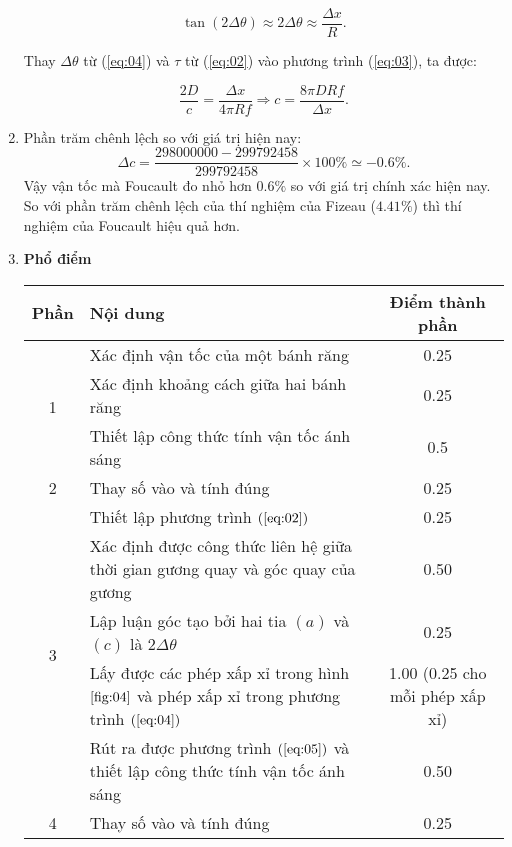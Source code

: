 \begin{enumerate}
    \begin{equation}
        \tan(2 \Delta \theta) \approx 2 \Delta \theta \approx \frac{\Delta x}{R}.
        \label{eq:04}
    \end{equation}

    Thay $\Delta \theta$ từ (\ref{eq:04}) và $\tau$ từ (\ref{eq:02}) vào phương trình (\ref{eq:03}), ta được:
    
    \begin{equation}
        \frac{2D}{c} = \frac{\Delta x }{4 \pi Rf} \Rightarrow c = \frac{8 \pi D R f}{\Delta x}.
        \label{eq:05}
    \end{equation}

    \item 
    Phần trăm chênh lệch so với giá trị hiện nay:
    \begin{equation}
        \Delta c = \frac{298 000 000 - 299 792 458}{299 792 458} \times 100 \% \simeq -0.6 \%.
    \end{equation}
    Vậy vận tốc mà Foucault đo nhỏ hơn $0.6\%$ so với giá trị chính xác hiện nay. So với phần trăm chênh lệch của thí nghiệm của Fizeau ($4.41 \%$) thì thí nghiệm của Foucault hiệu quả hơn.
    
    \item \textbf{Phổ điểm}
    
    \begin{center}
    \begin{tabular}{|c|p{8cm}|c|}
    \hline
    \multicolumn{1}{|l|}{Phần} & Nội dung & Điểm thành phần \\ 
    \hline
    \multirow{3}{*}{1}
    & Xác định vận tốc của một bánh răng & 0.25 \\
    \cline{2-3} 
    & Xác định khoảng cách giữa hai bánh răng & 0.25 \\
    \cline{2-3} 
    & Thiết lập công thức tính vận tốc ánh sáng & 0.5 \\
    \hline
    2 & Thay số vào và tính đúng & 0.25 \\
    \hline
    \multirow{5}{*}{3}         
    & Thiết lập phương trình $(\ref{eq:02})$ & 0.25 \\
    \cline{2-3} 
    & Xác định được công thức liên hệ giữa thời gian gương quay và góc quay của gương & 0.50 \\
    \cline{2-3} 
    & Lập luận góc tạo bởi hai tia $(a)$ và $(c)$ là $2 \Delta \theta$ & 0.25 \\
    \cline{2-3}
    & Lấy được các phép xấp xỉ trong hình $\ref{fig:04}$ và phép xấp xỉ trong phương trình $(\ref{eq:04})$ & 1.00 (0.25 cho mỗi phép xấp xỉ)  \\
    \cline{2-3}
    & Rút ra được phương trình $(\ref{eq:05})$ và thiết lập công thức tính vận tốc ánh sáng  & 0.50 \\
    \hline
    4 & Thay số vào và tính đúng & 0.25 \\
    \hline
    \end{tabular}
    \end{center}
    
\end{enumerate}
